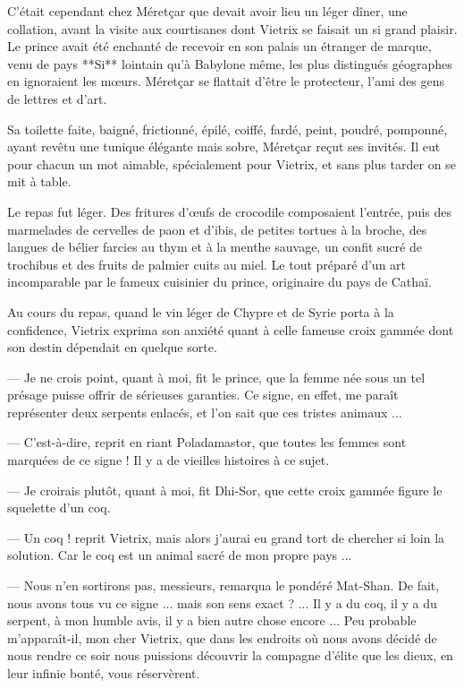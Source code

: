 \documentclass[a4paper, 11pt, oneside, polutonikogreek, french]{article}
\begin{document}
C'était cependant chez Méretçar que devait avoir lieu un léger dîner, une collation, avant la visite aux courtisanes dont Vietrix se faisait un si grand plaisir. Le prince avait été enchanté de recevoir en son palais un étranger de marque, venu de pays **Si** lointain qu'à Babylone même, les plus distingués géographes en ignoraient les mœurs. Méretçar se flattait d'être le protecteur, l'ami des gens de lettres et d'art.

\bigskip
\centerline{\EightStarTaper}
\centerline{\EightStarTaper\EightStarTaper}
\bigskip

Sa toilette faite, baigné, frictionné, épilé, coiffé, fardé, peint, poudré, pomponné, ayant revêtu une tunique élégante mais sobre, Méretçar reçut ses invités. Il eut pour chacun un mot aimable, spécialement pour Vietrix, et sans plus tarder on se mit à table.

Le repas fut léger. Des fritures d'œufs de crocodile composaient l'entrée, puis des marmelades de cervelles de paon et d'ibis, de petites tortues à la broche, des langues de bélier farcies au thym et à la menthe sauvage, un confit sucré de trochibus et des fruits de palmier cuits au miel. Le tout préparé d'un art incomparable par le fameux cuisinier du prince, originaire du pays de Cathaï.

\bigskip
\centerline{\EightStarTaper}
\centerline{\EightStarTaper\EightStarTaper}
\bigskip

Au cours du repas, quand le vin léger de Chypre et de Syrie porta à la confidence, Vietrix exprima son anxiété quant à celle fameuse croix gammée dont son destin dépendait en quelque sorte.

--- Je ne crois point, quant à moi, fit le prince, que la femme née sous un tel présage puisse offrir de sérieuses garanties. Ce signe, en effet, me paraît représenter deux serpents enlacés, et l'on sait que ces tristes animaux ...

--- C'est-à-dire, reprit en riant Poladamastor, que toutes les femmes sont marquées de ce signe ! Il y a de vieilles histoires à ce sujet.

--- Je croirais plutôt, quant à moi, fit Dhi-Sor, que cette croix gammée figure le squelette d'un coq.

--- Un coq ! reprit Vietrix, mais alors j'aurai eu grand tort de chercher si loin la solution. Car le coq est un animal sacré de mon propre pays ...

--- Nous n'en sortirons pas, messieurs, remarqua le pondéré Mat-Shan. De fait, nous avons tous vu ce signe ... mais son sens exact ? ... Il y a du coq, il y a du serpent, à mon humble avis, il y a bien autre chose encore ... Peu probable m'apparaît-il, mon cher Vietrix, que dans les endroits où nous avons décidé de nous rendre ce soir nous puissions découvrir la compagne d'élite que les dieux, en leur infinie bonté, vous réservèrent.
\end{document}

